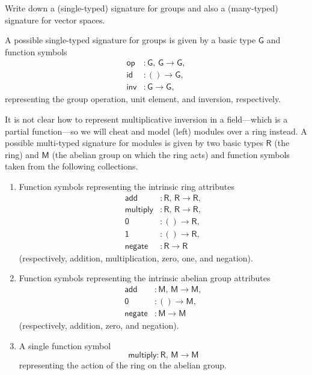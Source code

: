 \begin{exercise}
Write down a (single-typed) signature for groups and also a (many-typed) signature for vector spaces.
\end{exercise}

\begin{solution}
A possible single-typed signature for groups is given by a basic type \(\mathsf{G}\) and function symbols
\begin{align*}
\mathsf{op} &: \mathsf{G},\, \mathsf{G} \to \mathsf{G}, \\
\mathsf{id} &: () \to \mathsf{G}, \\
\mathsf{inv} &: \mathsf{G} \to \mathsf{G},
\end{align*}
representing the group operation, unit element, and inversion, respectively.
\end{solution}

\begin{solution}
It is not clear how to represent multiplicative inversion in a field---which is a partial function---so we will cheat and model (left) modules over a ring instead.
A possible multi-typed signature for modules is given by two basic types \(\mathsf{R}\) (the ring) and \(\mathsf{M}\) (the abelian group on which the ring acts) and function symbols taken from the following collections.
\begin{enumerate}
\item
Function symbols representing the intrinsic ring attributes
\begin{align*}
\mathsf{add} &: \mathsf{R},\, \mathsf{R} \to \mathsf{R}, \\
\mathsf{multiply} &: \mathsf{R},\, \mathsf{R} \to \mathsf{R}, \\
\mathsf{0} &: () \to \mathsf{R}, \\
\mathsf{1} &: () \to \mathsf{R}, \\
\mathsf{negate} &: \mathsf{R} \to \mathsf{R}
\end{align*}
(respectively, addition, multiplication, zero, one, and negation).
\item
Function symbols representing the intrinsic abelian group attributes
\begin{align*}
\mathsf{add} &: \mathsf{M},\, \mathsf{M} \to \mathsf{M}, \\
\mathsf{0} &: () \to \mathsf{M}, \\
\mathsf{negate} &: \mathsf{M} \to \mathsf{M}
\end{align*}
(respectively, addition, zero, and negation).
\item
A single function symbol
\begin{equation*}
\mathsf{multiply} : \mathsf{R},\,\mathsf{M} \to \mathsf{M}
\end{equation*}
representing the action of the ring on the abelian group.
\qedhere
\end{enumerate}
\end{solution}